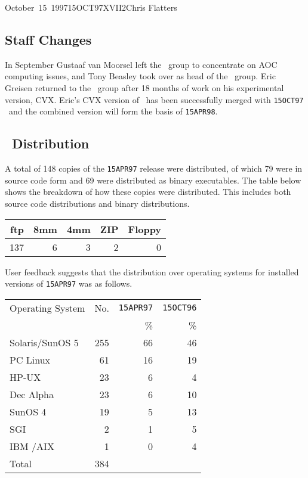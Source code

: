 \documentclass[twoside]{article}
\begin{document}
\begin{aipsletter}{October~15~1997}{15OCT97}{XVII}{2}{Chris Flatters}
\subsection{Staff Changes}

In September Gustaaf van Moorsel left the \AIPS\ group to concentrate on
AOC computing issues, and Tony Beasley took over as head of the \AIPS\
group. Eric Greisen returned to the \AIPS\ group after 18 months of work
on his experimental version, CVX. Eric's CVX version of \AIPS\ has been
successfully merged with \texttt{15OCT97} \AIPS\ and the combined version
will form the basis of \texttt{15APR98}.

\subsection{\AIPS\ Distribution}

A total of 148 copies of the \texttt{15APR97} release were
distributed, of which 79 were in source code form and 69 were
distributed as binary executables.  The table below shows the
breakdown of how these copies were distributed. This includes both
source code distributions and binary distributions.

\begin{center}
\begin{tabular}{|r|r|r|r|r|} \hline\hline
{ftp} & {8mm} & {4mm} & {ZIP} & {Floppy} \\ \hline
137   &    6  &    3  &    2  &       0  \\ \hline\hline
\end{tabular}
\end{center}

User feedback suggests that the distribution over operating systems
for installed versions of \texttt{15APR97} was as follows.

\begin{center}
\begin{tabular}{|l|r|r|r|} \hline\hline
{Operating System} & {No.} & \texttt{15APR97}  &  \texttt{15OCT96}  \\
                   &       & {\%}   &  {\%}  \\ \hline
Solaris/SunOS 5 &    255       & 66 & 46 \\
PC Linux        &     61       & 16 & 19 \\
HP-UX           &     23       &  6 &  4 \\
Dec Alpha       &     23       &  6 & 10 \\
SunOS 4         &     19       &  5 & 13 \\
SGI             &      2       &  1 &  5 \\
IBM /AIX        &      1       &  0 &  4  \\
Total           &    384       &    &     \\ \hline\hline
\end{tabular}
\end{center}


\end{aipsletter}
\end{document}
